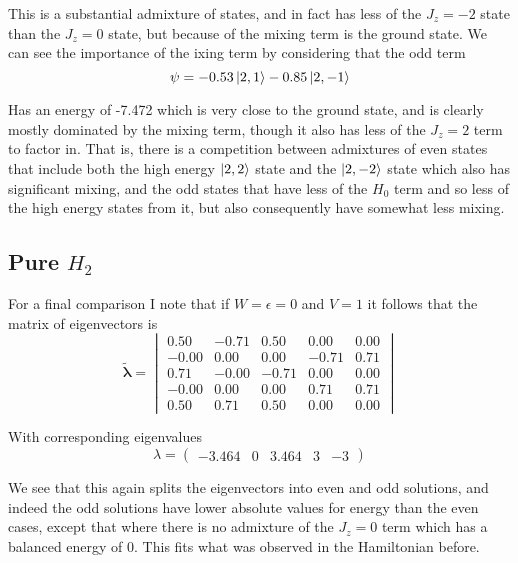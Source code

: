 \documentclass[11pt]{article} %
\begin{document}
This is a substantial admixture of states, and in fact has less of the $J_z=-2$ state than the $J_z=0$ state, but because of the mixing term is the ground state. We can see the importance of the ixing term by considering that the odd term \\
\begin{equation}
\psi=-0.53 \ket{2,1} -0.85 \ket{2,-1} \end{equation}

Has an energy of -7.472 which is very close to the ground state, and is clearly mostly dominated by the mixing term, though it also has less of the $J_z=2$ term to factor in. That is, there is a competition between admixtures of even states that include both the high energy $\ket{2,2}$ state and the $\ket{2,-2}$ state which also has significant mixing, and the odd states that have less of the $H_0$ term and so less of the high energy states from it, but also consequently have somewhat less mixing. \\

\subsection{Pure $H_2$}
For a final comparison I note that if $W=\epsilon=0$ and $V=1$ it follows that the matrix of eigenvectors is\\
\begin{equation}\mathbf{\tilde{\lambda}}=\begin{vmatrix}0.50 & -0.71 & 0.50 & 0.00 & 0.00 \\
-0.00 & 0.00 & 0.00 & -0.71 & 0.71 \\
0.71 & -0.00 & -0.71 & 0.00 & 0.00 \\
-0.00 & 0.00 & 0.00 & 0.71 & 0.71 \\
0.50 & 0.71 & 0.50 & 0.00 & 0.00 \end{vmatrix} \end{equation}

With corresponding eigenvalues\\

\begin{equation}
\lambda=\begin{pmatrix} -3.464 & 0 & 3.464 & 3 & -3 \end{pmatrix}\end{equation}

We see that this again splits the eigenvectors into even and odd solutions, and indeed the odd solutions have lower absolute values for energy than the even cases, except that where there is no admixture of the $J_z=0$ term which has a balanced energy of 0. This fits what was observed in the Hamiltonian before.\\
\end{document}
